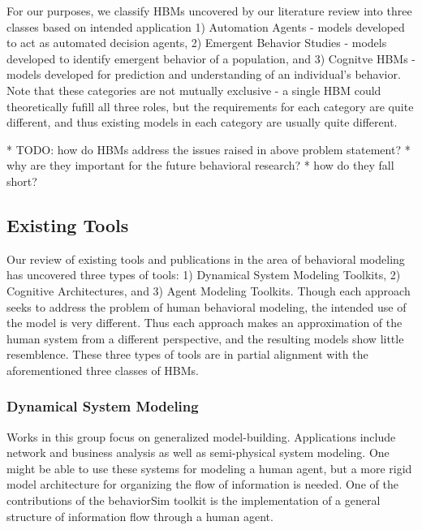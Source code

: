 \documentclass[conference]{IEEEtran}
\begin{document}
For our purposes, we classify HBMs uncovered by our literature review into three classes based on intended application 1) Automation Agents - models developed to act as automated decision agents, 2) Emergent Behavior Studies - models developed to identify emergent behavior of a population, and 3) Cognitve HBMs - models developed for prediction and understanding of an individual's behavior.
Note that these categories are not mutually exclusive - a single HBM could theoretically fufill all three roles, but the requirements for each category are quite different, and thus existing models in each category are usually quite different.


* TODO: how do HBMs address the issues raised in above problem statement?
* why are they important for the future behavioral research? \cite{Riley}
* how do they fall short?

\subsection{Existing Tools}
Our review of existing tools and publications in the area of behavioral modeling has uncovered three types of tools: 1) Dynamical System Modeling Toolkits, 2) Cognitive Architectures, and 3) Agent Modeling Toolkits. 
Though each approach seeks to address the problem of human behavioral modeling, the intended use of the model is very different. 
Thus each approach makes an approximation of the human system from a different perspective, and the resulting models show little resemblence.
These three types of tools are in partial alignment with the aforementioned three classes of HBMs.

\subsubsection{Dynamical System Modeling}
Works in this group focus on generalized model-building. 
Applications include network and business analysis as well as semi-physical system modeling. 
One might be able to use these systems for modeling a human agent, but a more rigid model architecture for organizing the flow of information is needed. 
One of the contributions of the behaviorSim toolkit is the implementation of a general structure of information flow through a human agent.
\end{document}
